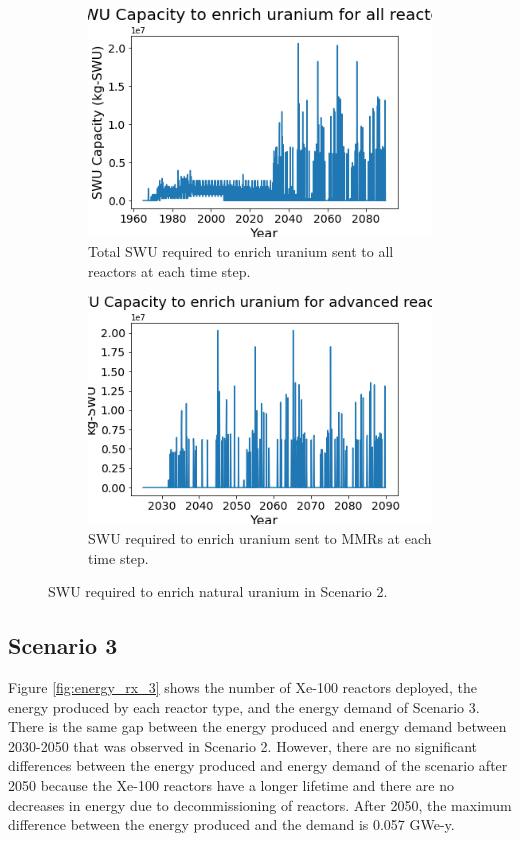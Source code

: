 \begin{figure}
    \centering
    \begin{subfigure}{0.4\textwidth}
        \centering
        \includegraphics[scale=0.3]{figures/totalswu_scenarios_2.png}
        \caption{Total \gls{SWU} required to enrich uranium sent to all reactors at each time step.}
        \label{fig:totalswu_2}
    \end{subfigure}
    \begin{subfigure}{0.4\textwidth}
        \centering
        \includegraphics[scale=0.3]{figures/haleuSWU_scenarios_2.png}
        \caption{\gls{SWU} required to enrich uranium sent to \glspl{MMR} at each time step.}
        \label{fig:haleuswu_2}
    \end{subfigure}
    \caption{\gls{SWU} required to enrich natural uranium in Scenario 2.}
    \label{fig:swu_2}
\end{figure}

\subsection{Scenario 3}
Figure \ref{fig:energy_rx_3} shows the number of Xe-100 reactors deployed, 
the energy produced by each reactor type, and the energy demand of Scenario 3. 
There is the same gap between the energy produced and energy demand between 
2030-2050 that was observed in Scenario 2. However, there are no significant 
differences between the energy produced and energy demand of the scenario 
after 2050 because the Xe-100 reactors have a longer lifetime and there are 
no decreases in energy due to decommissioning of reactors. After 2050, the 
maximum difference between the energy produced and the demand is 0.057 GWe-y. 


